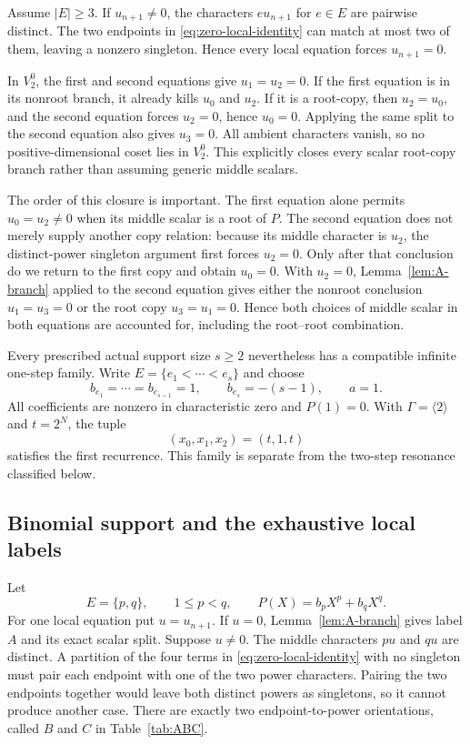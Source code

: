 \documentclass[11pt]{article}
\theoremstyle{definition}
\theoremstyle{remark}
\newcommand{\Gam}{\Gamma}
\begin{document}
Assume $|E|\geq3$.  If $u_{n+1}\neq0$, the characters $e u_{n+1}$ for $e\in E$ are pairwise distinct.  The two endpoints in \eqref{eq:zero-local-identity} can match at most two of them, leaving a nonzero singleton.  Hence every local equation forces $u_{n+1}=0$.

In $V_2^0$, the first and second equations give $u_1=u_2=0$.  If the first equation is in its nonroot branch, it already kills $u_0$ and $u_2$.  If it is a root-copy, then $u_2=u_0$, and the second equation forces $u_2=0$, hence $u_0=0$.  Applying the same split to the second equation also gives $u_3=0$.  All ambient characters vanish, so no positive-dimensional coset lies in $V_2^0$.  This explicitly closes every scalar root-copy branch rather than assuming generic middle scalars.

The order of this closure is important.  The first equation alone permits
$u_0=u_2\neq0$ when its middle scalar is a root of $P$.  The second equation
does not merely supply another copy relation: because its middle character
is $u_2$, the distinct-power singleton argument first forces $u_2=0$.
Only after that conclusion do we return to the first copy and obtain
$u_0=0$.  With $u_2=0$, Lemma~\ref{lem:A-branch} applied to the second
equation gives either the nonroot conclusion $u_1=u_3=0$ or the root copy
$u_3=u_1=0$.  Hence both choices of middle scalar in both equations are
accounted for, including the root--root combination.

Every prescribed actual support size $s\geq2$ nevertheless has a compatible infinite one-step family.  Write
$E=\{e_1<\cdots<e_s\}$ and choose
\begin{equation}
b_{e_1}=\cdots=b_{e_{s-1}}=1,\qquad b_{e_s}=-(s-1),
\qquad a=1.
\label{eq:multisupport-coefficients}
\end{equation}
All coefficients are nonzero in characteristic zero and $P(1)=0$.  With
$\Gam=\langle2\rangle$ and $t=2^N$, the tuple
\begin{equation}
(x_0,x_1,x_2)=(t,1,t)
\label{eq:multisupport-tuple}
\end{equation}
satisfies the first recurrence.  This family is separate from the two-step resonance classified below.

\subsection{Binomial support and the exhaustive local labels}

Let
\begin{equation}
E=\{p,q\},\qquad 1\leq p<q,
\qquad P(X)=b_pX^p+b_qX^q.
\label{eq:binomial-P}
\end{equation}
For one local equation put $u=u_{n+1}$.  If $u=0$, Lemma~\ref{lem:A-branch} gives label $A$ and its exact scalar split.  Suppose $u\neq0$.  The middle characters $pu$ and $qu$ are distinct.  A partition of the four terms in \eqref{eq:zero-local-identity} with no singleton must pair each endpoint with one of the two power characters.  Pairing the two endpoints together would leave both distinct powers as singletons, so it cannot produce another case.  There are exactly two endpoint-to-power orientations, called $B$ and $C$ in Table~\ref{tab:ABC}.
\end{document}
